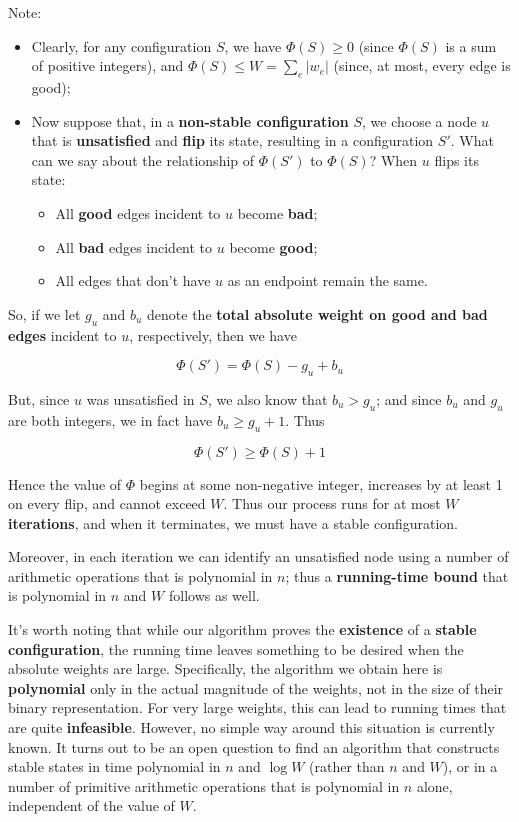 Note:
\begin{itemize}
    \item Clearly, for any configuration $S$, we have $\Phi(S) \geq 0$ (since $\Phi(S)$ is a sum of positive integers), and $\Phi(S) \leq W = \sum_e |w_e|$ (since, at most, every edge is good);
    \item Now suppose that, in a \textbf{non-stable configuration} $S$, we choose a node $u$ that is \textbf{unsatisfied} and \textbf{flip} its state, resulting in a configuration $S'$. What can we say about the relationship of $\Phi(S')$ to $\Phi(S)$? When $u$ flips its state:
    \begin{itemize}
        \item All \textbf{good} edges incident to $u$ become \textbf{bad};
        \item All \textbf{bad} edges incident to $u$ become \textbf{good};
        \item All edges that don’t have $u$ as an endpoint remain the same.
    \end{itemize}
\end{itemize} 

So, if we let $g_u$ and $b_u$ denote the \textbf{total absolute weight on good and bad edges} incident to $u$, respectively, then we have

$$\Phi(S') = \Phi(S) - g_u + b_u$$

But, since $u$ was unsatisfied in $S$, we also know that $b_u > g_u$; and since $b_u$ and $g_u$ are both integers, we in fact have $b_u \geq g_u + 1$. Thus

$$\Phi(S') \geq \Phi(S) + 1$$

Hence the value of $\Phi$ begins at some non-negative integer, increases by at least 1 on every flip, and cannot exceed $W$. Thus our process runs for at most $W$ \textbf{iterations}, and when it terminates, we must have a stable configuration. 

Moreover, in each iteration we can identify an unsatisfied node using a number of arithmetic operations that is polynomial in $n$; thus a \textbf{running-time bound} that is polynomial in $n$ and $W$ follows as well.

It’s worth noting that while our algorithm proves the \textbf{existence} of a \textbf{stable configuration}, the running time leaves something to be desired when the absolute weights are large. Specifically, the algorithm we obtain here is \textbf{polynomial} only in the actual magnitude of the weights, not in the size of their binary representation. For very large weights, this can lead to running times that are quite \textbf{infeasible}. However, no simple way around this situation is currently known. It turns out to be an open question to find an algorithm that constructs stable states in time polynomial in $n$ and $\log W$ (rather than $n$ and $W$), or in a number of primitive arithmetic operations that is polynomial in $n$ alone, independent of the value of $W$.


